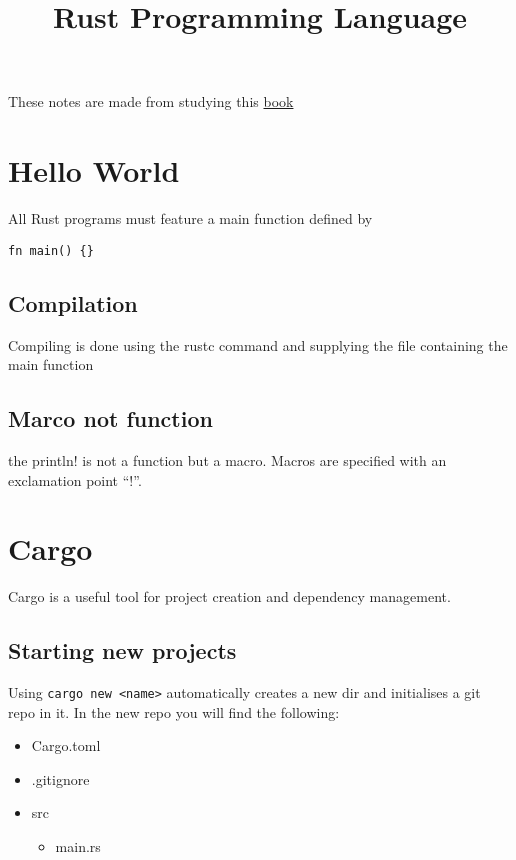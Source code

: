 \documentclass[12pt,notitlepage]{article}
\begin{document}
\title{Rust Programming Language}
\author{}
\date{}
\maketitle


These notes are made from studying this
\href{https://doc.rust-lang.org/book/title-page.html}{book} 

\section{Hello World}

All Rust programs must feature a main function defined by

\begin{lstlisting}
fn main() {}
\end{lstlisting}


\subsection{Compilation}

Compiling is done using the rustc command and supplying the file containing the
main function

\subsection{Marco not function}

the println! is not a function but a macro. Macros are specified with an
exclamation point ``!''.

\section{Cargo}

Cargo is a useful tool for project creation and dependency management.

\subsection{Starting new projects}

Using \lstinline{cargo new <name>} automatically creates a new dir and
initialises a git repo in it. In the new repo you will find the following:

\begin{itemize}
    \item Cargo.toml
    \item .gitignore
    \item src
        \begin{itemize}
            \item main.rs
        \end{itemize}
\end{itemize}
\end{document}
